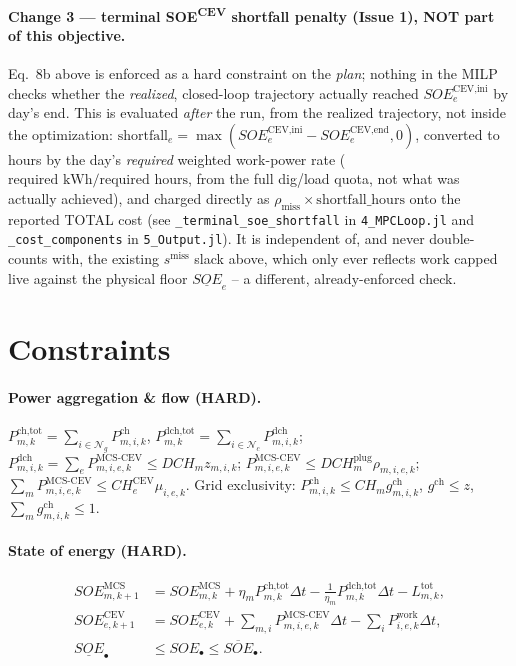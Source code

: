 \documentclass[11pt]{article}
\newcommand{\dt}{\Delta t}
\begin{document}
\paragraph{Change 3 --- terminal SOE\textsuperscript{CEV} shortfall penalty (Issue 1), NOT part of
this objective.} Eq.~8b above is enforced as a hard constraint on the \emph{plan}; nothing in the
MILP checks whether the \emph{realized}, closed-loop trajectory actually reached
$SOE^{\text{CEV,ini}}_e$ by day's end. This is evaluated \emph{after} the run, from the realized
trajectory, not inside the optimization: $\text{shortfall}_e=\max(SOE^{\text{CEV,ini}}_e-
SOE^{\text{CEV,end}}_e,0)$, converted to hours by the day's \emph{required} weighted work-power rate
($\text{required kWh}/\text{required hours}$, from the full dig/load quota, not what was actually
achieved), and
charged directly as $\rho_{\text{miss}}\times\text{shortfall\_hours}$ onto the reported TOTAL cost
(see \texttt{\_terminal\_soe\_shortfall} in \texttt{4\_MPCLoop.jl} and \texttt{\_cost\_components}
in \texttt{5\_Output.jl}). It is independent of, and never double-counts with, the existing
$s^{\text{miss}}$ slack above, which only ever reflects work capped live against the physical floor
$\underline{SOE}_e$ -- a different, already-enforced check.


\section{Constraints}

\paragraph{Power aggregation \& flow (HARD).}
$P^{\text{ch,tot}}_{m,k}=\sum_{i\in\mathcal{N}_g}P^{\text{ch}}_{m,i,k}$,
$P^{\text{dch,tot}}_{m,k}=\sum_{i\in\mathcal{N}_c}P^{\text{dch}}_{m,i,k}$;
$P^{\text{dch}}_{m,i,k}=\sum_e P^{\text{MCS-CEV}}_{m,i,e,k}\le DCH_m z_{m,i,k}$;
$P^{\text{MCS-CEV}}_{m,i,e,k}\le DCH^{\text{plug}}_m\rho_{m,i,e,k}$;
$\sum_m P^{\text{MCS-CEV}}_{m,i,e,k}\le CH^{\text{CEV}}_e\mu_{i,e,k}$.
Grid exclusivity: $P^{\text{ch}}_{m,i,k}\le CH_m g^{\text{ch}}_{m,i,k}$,
$g^{\text{ch}}\le z$, $\sum_m g^{\text{ch}}_{m,i,k}\le 1$.

\paragraph{State of energy (HARD).}
\begin{align}
SOE^{\text{MCS}}_{m,k+1}&=SOE^{\text{MCS}}_{m,k}+\eta_m P^{\text{ch,tot}}_{m,k}\dt-\tfrac{1}{\eta_m}P^{\text{dch,tot}}_{m,k}\dt-L^{\text{tot}}_{m,k},\\
SOE^{\text{CEV}}_{e,k+1}&=SOE^{\text{CEV}}_{e,k}+\textstyle\sum_{m,i}P^{\text{MCS-CEV}}_{m,i,e,k}\dt-\sum_i P^{\text{work}}_{i,e,k}\dt,\\
\underline{SOE}_\bullet&\le SOE_\bullet\le\overline{SOE}_\bullet .
\end{align}
\end{document}
